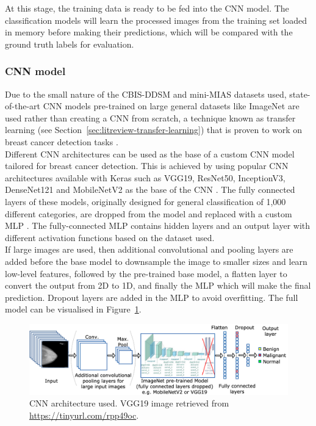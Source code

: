 At this stage, the training data is ready to be fed into the CNN model. The classification models will learn the processed images from the training set loaded in memory before making their predictions, which will be compared with the ground truth labels for evaluation.

\subsubsection{CNN model}
\label{sec:design-cnn-model-decision}

Due to the small nature of the CBIS-DDSM and mini-MIAS datasets used, state-of-the-art CNN models pre-trained on large general datasets like ImageNet are used rather than creating a CNN from scratch, a technique known as transfer learning (see Section~\ref{sec:litreview-transfer-learning}) that is proven to work on breast cancer detection tasks \citep{Shen2017, Falconi2019}.\\

Different CNN architectures can be used as the base of a custom CNN model tailored for breast cancer detection. This is achieved by using popular CNN architectures available with Keras such as VGG19, ResNet50, InceptionV3, DenseNet121 and MobileNetV2 as the base of the CNN \citep{kerasApplications}. The fully connected layers of these models, originally designed for general classification of 1,000 different categories, are dropped from the model and replaced with a custom MLP \citep{Krizhevsky2012}. The fully-connected MLP contains hidden layers and an output layer with different activation functions based on the dataset used.\\

If large images are used, then additional convolutional and pooling layers are added before the base model to downsample the image to smaller sizes and learn low-level features, followed by the pre-trained base model, a flatten layer to convert the output from 2D to 1D, and finally the MLP which will make the final prediction. Dropout layers are added in the MLP to avoid overfitting. The full model can be visualised in Figure~\ref{fig:design-CNN architecture}.

\begin{figure}[ht]
\centerline{\includegraphics[width=1.2\textwidth]{figures/design/CNN architecture.png}}
\caption{\label{fig:design-CNN architecture}CNN architecture used. VGG19 image retrieved from \url{https://tinyurl.com/rpp49oc}.}
\end{figure}

